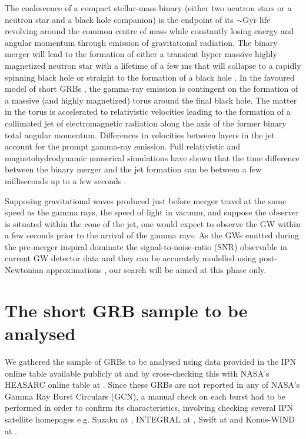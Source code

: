 \documentclass[a4paper]{jpconf}
\begin{document}
The coalescence of a compact stellar-mass binary (either two neutron stars or a neutron star and a black hole companion) is the endpoint of its $\sim$Gyr life revolving around the common centre of mass while constantly losing energy and angular momentum through emission of gravitational radiation. The binary merger will lead to the formation of either a transient hyper massive highly magnetized neutron star with a lifetime of a few ms \cite{Shibata:2005mz, Duez:2005cj} that will collapse to a rapidly spinning black hole or straight to the formation of a black hole \cite{ShibTan06, Shibata:2007zm}.  In the favoured model of short GRBs \cite{Shibata:2005mz, Kiuchi:2010ze, Rezzolla:2011da, Oechslin:2005mw}, the gamma-ray emission is contingent on the formation of a massive (and highly magnetized) torus around the final black hole. The matter in the torus is accelerated to relativistic velocities leading to the formation of a collimated jet of electromagnetic radiation along the axis of the former binary total angular momentum. Differences in velocities between layers in the jet account for the prompt gamma-ray emission. Full relativistic and magnetohydrodynamic numerical simulations have shown that the time difference between the binary merger and the jet formation can be between a few milliseconds up to a few seconds \cite{ShibTan06, Shibata:2007zm, Rezzolla:2011da, Oechslin:2005mw}. 

Supposing gravitational waves produced just before merger travel at the same speed as the gamma rays, the speed of light in vacuum, and suppose the observer is situated within the cone of the jet, one would expect to observe the GW within a few seconds prior to the arrival of the gamma rays.
 As the GWs emitted during the pre-merger inspiral dominate the signal-to-noise-ratio (SNR) observable in current GW detector data and they can be accurately modelled using post-Newtonian approximations \cite{ABIQ04, AIQS06a}, our search will be aimed at this phase only.

\section{The short GRB sample to be analysed}

We gathered the sample of GRBs to be analysed using data provided in the IPN online table available publicly at \cite{HurleyHTML} and by cross-checking this with NASA's HEASARC online table at \cite{heasarc}. Since these GRBs are not reported in any of NASA's Gamma Ray Burst Circulars (GCN), a manual check on each burst had to be performed in order to confirm its characteristics, involving checking several IPN satellite homepages e.g. Suzaku at \cite{suzaku}, INTEGRAL at \cite{integral}, Swift at \cite{swift} and Konus-WIND at \cite{konus}.
\end{document}

